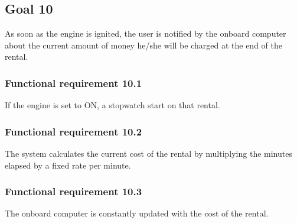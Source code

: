 \subsection{Goal 10}
As soon as the engine is ignited, the user is notified by the onboard computer about the current amount of money he/she will be charged at the end of the rental.

\setcounter{secnumdepth}{3}
\subsubsection{Functional requirement 10.1}
If the engine is set to ON, a stopwatch start on that rental.

\subsubsection{Functional requirement 10.2}
The system calculates the current cost of the rental by multiplying the minutes elapsed by a fixed rate per minute.

\subsubsection{Functional requirement 10.3}
The onboard computer is constantly updated with the cost of the rental.